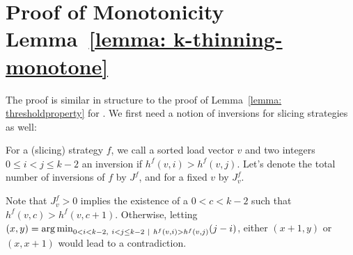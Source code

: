 \chapter{Proof of \KThinning Monotonicity Lemma~\ref{lemma: k-thinning-monotone}}\label{k-thinning-monotone-proof}



The proof is similar in structure to the proof of Lemma~\ref{lemma: thresholdproperty} for \TwoThinning. We first need a notion of inversions for \KThinning slicing strategies as well:


\begin{definition} 
For a (slicing) strategy $f$, we call a sorted load vector $v$ and two integers $0\leq i<j\leq k-2$ an inversion if $h^f(v,i)>h^f(v,j)$. Let's denote the total number of inversions of $f$ by $J^f$, and for a fixed $v$ by $J^f_v$.
\end{definition}

\begin{remark} 
Note that $J^f_v>0$ implies the existence of a $0<c<k-2$ such that $h^f(v,c)>h^f(v,c+1)$. Otherwise, letting $(x,y)=\argmin_{0<i<k-2,\ i<j\leq k-2\ \mid\ h^f(v,i)>h^f(v,j)} (j-i)$, either $(x+1,y)$ or $(x,x+1)$ would lead to a contradiction. 
\end{remark}



